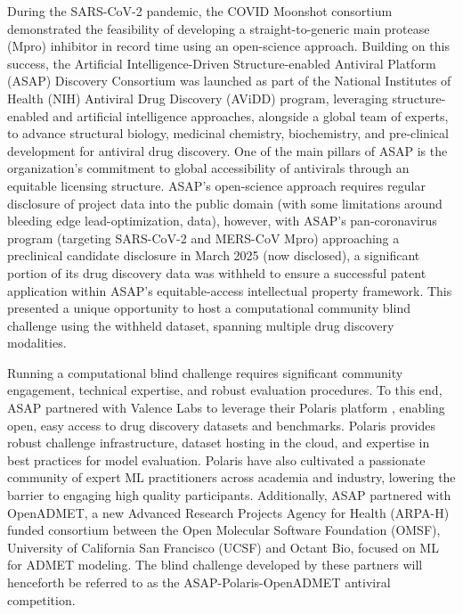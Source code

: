 \documentclass[journal=jcim,manuscript=article]{achemso}
\begin{document}
During the SARS-CoV-2 pandemic, the COVID Moonshot consortium demonstrated the feasibility of developing a straight-to-generic main protease (Mpro) inhibitor in record time using an open-science approach\cite{boby_2023}. Building on this success, the Artificial Intelligence-Driven Structure-enabled Antiviral Platform (ASAP) Discovery Consortium\cite{ASAP_website} was launched as part of the National Institutes of Health (NIH) Antiviral Drug Discovery (AViDD) program\cite{AVIDD_niaid_2022}, leveraging structure-enabled and artificial intelligence approaches, alongside a global team of experts, to advance structural biology, medicinal chemistry, biochemistry, and pre-clinical development for antiviral drug discovery. One of the main pillars of ASAP is the organization's commitment to global accessibility of antivirals through an equitable licensing structure\cite{griffen_2024}. ASAP's open-science approach requires regular disclosure of project data into the public domain (with some limitations around bleeding edge lead-optimization, data), however, with ASAP's pan-coronavirus program (targeting SARS-CoV-2 and MERS-CoV Mpro\cite{sars_mers_tcp}) approaching a preclinical candidate disclosure in March 2025 (now disclosed)\cite{griffen_2025_acs}, a significant portion of its drug discovery data was withheld to ensure a successful patent application within ASAP's equitable-access intellectual property framework. This presented a unique opportunity to host a computational community blind challenge using the withheld dataset, spanning multiple drug discovery modalities.

Running a computational blind challenge requires significant community engagement, technical expertise, and robust evaluation procedures. To this end, ASAP partnered with Valence Labs to leverage their Polaris platform \cite{wognum_call_2024, Polaris_website}, enabling open, easy access to drug discovery datasets and benchmarks. Polaris provides robust challenge infrastructure, dataset hosting in the cloud, and expertise in best practices for model evaluation. Polaris have also cultivated a passionate community of expert ML practitioners across academia and industry, lowering the barrier to engaging high quality participants. Additionally, ASAP partnered with OpenADMET, a new Advanced Research Projects Agency for Health (ARPA-H)\cite{ARPAH_website} funded consortium between the Open Molecular Software Foundation (OMSF)\cite{OMSF_website}, University of California San Francisco (UCSF) and Octant Bio\cite{Octant_website}, focused on ML for ADMET modeling. The blind challenge developed by these partners will henceforth be referred to as the ASAP-Polaris-OpenADMET antiviral competition.
\end{document}
